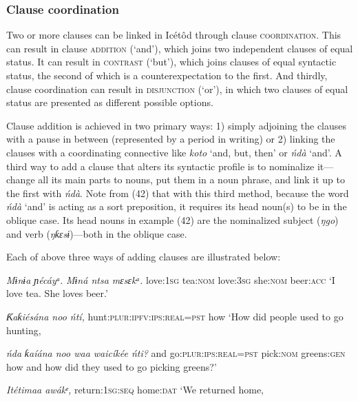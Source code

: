 \begin{table}
\subsubsection{Clause coordination}

Two or more clauses can be linked in Icétôd through clause \textsc{coordination}. This can result in clause \textsc{addition} (‘and’), which joins two independent clauses of equal status. It can result in \textsc{contrast }(‘but’), which joins clauses of equal syntactic status, the second of which is a counterexpectation to the first. And thirdly, clause coordination can result in \textsc{disjunction} (‘or’), in which two clauses of equal status are presented as different possible options.

Clause addition is achieved in two primary ways: 1) simply adjoining the clauses with a pause in between (represented by a period in writing) or 2) linking the clauses with a coordinating connective like \textit{koto }‘and, but, then’ or \textit{ńdà }‘and’. A third way to add a clause that alters its syntactic profile is to nominalize it—change all its main parts to nouns, put them in a noun phrase, and link it up to the first with \textit{ńdà}. Note from (42) that with this third method, because the word \textit{ńdà }‘and’ is acting as a sort preposition, it requires its head noun(s) to be in the oblique case. Its head nouns in example (42) are the nominalized subject (\textit{ŋgo}) and verb (\textit{ŋƙɛsɨ})—both in the oblique case.

Each of above three ways of adding clauses are illustrated below:




\textit{Mɨnɨa     ɲécáyᵃ}.\textit{   Mɨná       ntsa   mɛsɛkᵃ.}
love:\textsc{1sg}   tea:\textsc{nom}   love:\textsc{3sg} she:\textsc{nom}   beer:\textsc{acc}
‘I love tea. She loves beer.’




\textit{Ƙ}\textit{aƙiésána noo       ńtí,}
hunt:\textsc{plur:ipfv:ips:real=pst}   how
‘How did people used to go hunting,



\textit{ńda}\textit{   ƙaíána noo         waa   waicíkée     ńti?}
and   go:\textsc{plur:ips:real=pst} pick:\textsc{nom} greens:\textsc{gen} how
and how did they used to go picking greens?’




\textit{Itétimaa awákᵉ,}
return:\textsc{1sg:seq} home:\textsc{dat} 
‘We returned home,




\end{table}
